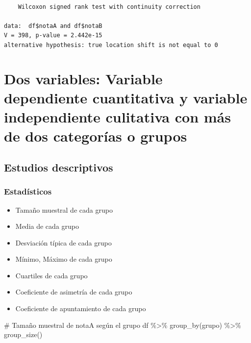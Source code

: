 \documentclass[
  a4paper,
]{scrreport}
\newenvironment{Shaded}{\begin{snugshade}}{\end{snugshade}}
\newcommand{\CommentTok}[1]{\textcolor[rgb]{0.37,0.37,0.37}{#1}}
\newcommand{\FunctionTok}[1]{\textcolor[rgb]{0.28,0.35,0.67}{#1}}
\newcommand{\NormalTok}[1]{\textcolor[rgb]{0.00,0.23,0.31}{#1}}
\newcommand{\SpecialCharTok}[1]{\textcolor[rgb]{0.37,0.37,0.37}{#1}}
\providecommand{\tightlist}{%
  \setlength{\itemsep}{0pt}\setlength{\parskip}{0pt}}\usepackage{longtable,booktabs,array}
\theoremstyle{definition}
\theoremstyle{definition}
\theoremstyle{remark}
\begin{document}
\begin{verbatim}

    Wilcoxon signed rank test with continuity correction

data:  df$notaA and df$notaB
V = 398, p-value = 2.442e-15
alternative hypothesis: true location shift is not equal to 0
\end{verbatim}

\hypertarget{dos-variables-variable-dependiente-cuantitativa-y-variable-independiente-culitativa-con-muxe1s-de-dos-categoruxedas-o-grupos}{%
\section{Dos variables: Variable dependiente cuantitativa y variable
independiente culitativa con más de dos categorías o
grupos}\label{dos-variables-variable-dependiente-cuantitativa-y-variable-independiente-culitativa-con-muxe1s-de-dos-categoruxedas-o-grupos}}

\hypertarget{estudios-descriptivos-4}{%
\subsection{Estudios descriptivos}\label{estudios-descriptivos-4}}

\hypertarget{estaduxedsticos-4}{%
\subsubsection{Estadísticos}\label{estaduxedsticos-4}}

\begin{itemize}
\tightlist
\item
  Tamaño muestral de cada grupo
\item
  Media de cada grupo
\item
  Desviación típica de cada grupo
\item
  Mínimo, Máximo de cada grupo
\item
  Cuartiles de cada grupo
\item
  Coeficiente de asimetría de cada grupo
\item
  Coeficiente de apuntamiento de cada grupo
\end{itemize}

\begin{Shaded}
\begin{Highlighting}[]
\CommentTok{\# Tamaño muestral de notaA según el grupo}
\NormalTok{df }\SpecialCharTok{\%\textgreater{}\%} \FunctionTok{group\_by}\NormalTok{(grupo) }\SpecialCharTok{\%\textgreater{}\%} \FunctionTok{group\_size}\NormalTok{()}
\end{Highlighting}
\end{Shaded}
\end{document}
